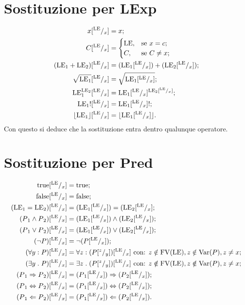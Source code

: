 \documentclass[a4paper, 12pt, oneside,fleqn]{book}
\begin{document}
\section{Sostituzione per LExp}
\begin{align*}
   x [^{\mathrm{LE}}/_ x ]
    &=  x ;\\
   C[^{\mathrm{LE}}/_ x ]
    &=
      \begin{cases}
        \mathrm{LE}, &\text{se $x  =  c$;} \\
        C,   &\text{se $C \neq  x$;}
      \end{cases} \\
  (\mathrm{LE}_1 + \mathrm{LE}_2)[^{\mathrm{LE}}/_ x ] 
     &= (\mathrm{LE}_1[^{\mathrm{LE}}/_x]) + (\mathrm{LE}_2[^{\mathrm{LE}}/_x]);\\
  \sqrt{\mathrm{LE}_1}[^{\mathrm{LE}}/_x] 
     &= \sqrt{{\mathrm{LE}_1}[^{\mathrm{LE}}/_x]};\\
  \mathrm{LE}_1^{\mathrm{LE}{_2}}[^{\mathrm{LE}}/_x] 
     &= \mathrm{LE}_1[^{\mathrm{LE}}/_x]^{\mathrm{LE}{_2}[^{\mathrm{LE}}/_ x ]};\\
  {\mathrm{LE}_1}![^{\mathrm{LE}}/_ x ] 
     &= {{\mathrm{LE}_1}[^{\mathrm{LE}}/_ x ]}!;\\
  \lfloor \mathrm{LE}_1 \rfloor[^{\mathrm{LE}}/_ x] 
     &= \lfloor \mathrm{LE}_1[^{\mathrm{LE}}/_x] \rfloor.\\
\end{align*}
Con questo si deduce che la sostituzione entra dentro qualunque operatore.
\section{Sostituzione per Pred}
\begin{align*}
  \mathrm{true}[^{\mathrm{LE}}/_ x ] 
    &= \mathrm{true};\\
  \mathrm{false}[^{\mathrm{LE}}/_ x ] 
    &= \mathrm{false};\\
  (\mathrm{LE}{_1} = \mathrm{LE}{_2})[^{\mathrm{LE}}/_ x ] 
    &= (\mathrm{LE}{_1}[^{\mathrm{LE}}/_ x ]) = (\mathrm{LE}{_2}[^{\mathrm{LE}}/_ x ]; \\
  (P{_1} \wedge P{_2})[^{\mathrm{LE}}/_ x ] 
    &= (\mathrm{LE}{_1}[^{\mathrm{LE}}/_ x ]) \wedge (\mathrm{LE}{_2}[^{\mathrm{LE}}/_x]);\\
  (P{_1} \vee P{_2})[^{\mathrm{LE}}/_ x ] 
    &= (\mathrm{LE}{_1}[^{\mathrm{LE}}/_ x ]) \vee (\mathrm{LE}{_2}[^{\mathrm{LE}}/_ x ]);\\
  (\neg P)[^{\mathrm{LE}}/_ x ] 
    &= \neg(P[^{\mathrm{LE}}/_ x ]);\\
  (\forall y\mathrel{:} P)[^{\mathrm{LE}}/_x ] 
    &= \forall z\mathrel{:} (P[^z/_y])[^{\mathrm{LE}}/_x] \text{ con: $z\notin\mathrm{FV}(\mathrm{LE}), z\notin\mathrm{Var}(P),z\neq x$};\\
  (\exists  y\mathrel{.} P)[^{\mathrm{LE}}/_x] 
    &= \exists z\mathrel{.} (P[^z/_y])[^{\mathrm{LE}}/_x] \text{ con: $z\notin\mathrm{FV}(\mathrm{LE}),  z\notin\mathrm{Var}(P), z\neq x$};\\
  (P{_1} \Rightarrow P{_2})[^{\mathrm{LE}}/_ x ] 
    &= (P{_1}[^{\mathrm{LE}}/_x]) \Rightarrow (P{_2}[^{\mathrm{LE}}/_x]);\\
  (P{_1} \Leftrightarrow P{_2})[^{\mathrm{LE}}/_ x ] 
    &= (P{_1}[^{\mathrm{LE}}/_x]) \Leftrightarrow (P{_2}[^{\mathrm{LE}}/_x]); \\
  (P{_1} \Leftarrow P{_2})[^{\mathrm{LE}}/_x] 
    &= (P{_1}[^{\mathrm{LE}}/_x]) \Leftarrow (P{_2}[^{\mathrm{LE}}/_x]).
\end{align*}
\end{document}
